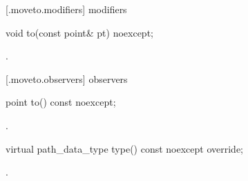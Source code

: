  [\iotwod.moveto.modifiers]{ modifiers}

\begin{itemdecl}
    void to(const point& pt) noexcept;
\end{itemdecl}
\begin{itemdescr}
	\pnum
	\postconditions
	.
	
\end{itemdescr}

 [\iotwod.moveto.observers]{ observers}

\begin{itemdecl}
    point to() const noexcept;
\end{itemdecl}
\begin{itemdescr}
	\pnum
	\returns
	.

\end{itemdescr}

\begin{itemdecl}
    virtual path_data_type type() const noexcept override;
\end{itemdecl}
\begin{itemdescr}
	\pnum
	\returns
	.

\end{itemdescr}

